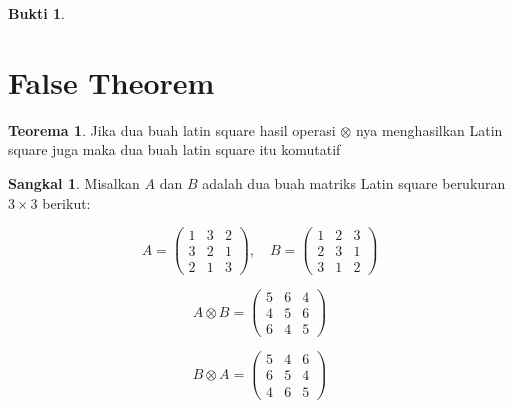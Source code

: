 \documentclass{article}
\theoremstyle{definition}
\newtheorem{teorema}{Teorema}
\newtheorem*{bukti}{Bukti}
\newtheorem*{sangkal}{Sangkal}
\begin{document}
\begin{bukti}
  \section{False Theorem}
  \begin{teorema}
    Jika dua buah latin square hasil operasi $\otimes$ nya menghasilkan Latin square juga maka dua buah latin square itu komutatif
  \end{teorema}
  \begin{sangkal}
    Misalkan $A$ dan $B$ adalah dua buah matriks Latin square berukuran $3 \times 3$ berikut:

    $$A = \begin{pmatrix} 1 & 3 & 2 \\ 3 & 2 & 1 \\ 2 & 1 & 3 \end{pmatrix}, \quad B = \begin{pmatrix} 1 & 2 & 3 \\ 2 & 3 & 1 \\ 3 & 1 & 2 \end{pmatrix}$$

    $$A \otimes B = \begin{pmatrix} 5 & 6 & 4 \\ 4 & 5 & 6 \\ 6 & 4 & 5 \end{pmatrix}$$

    $$B \otimes A = \begin{pmatrix} 5 & 4 & 6 \\ 6 & 5 & 4 \\ 4 & 6 & 5 \end{pmatrix}$$

  \end{sangkal}
\end{bukti}
\end{document}
